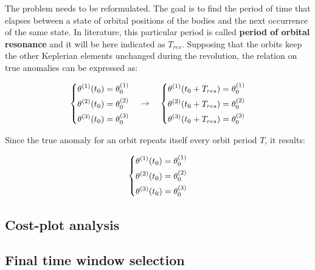 The problem needs to be reformulated. The goal is to find the period of time that elapses between a state of orbital positions of the bodies and the next occurrence of the same state. In literature, this particular period is called \textbf{period of orbital resonance} and it will be here indicated as $T_{res}$. Supposing that the orbits keep the other Keplerian elements unchanged during the revolution, the relation on true anomalies can be expressed as:

\begin{equation}
    \begin{dcases}
        \theta^{(1)} (t_0) = \theta_0^{(1)} \\
        \theta^{(2)} (t_0) = \theta_0^{(2)} \\
        \theta^{(3)} (t_0) = \theta_0^{(3)}
    \end{dcases}
    \quad \rightarrow \quad
    \begin{dcases}
        \theta^{(1)} (t_0 + T_{res}) = \theta_0^{(1)} \\
        \theta^{(2)} (t_0 + T_{res}) = \theta_0^{(2)} \\
        \theta^{(3)} (t_0 + T_{res}) = \theta_0^{(3)}
    \end{dcases}
\end{equation}

Since the true anomaly for an orbit repeats itself every orbit period $T$, it results:

\begin{equation}
    \begin{dcases}
        \theta^{(1)} (t_0) = \theta_0^{(1)} \\
        \theta^{(2)} (t_0) = \theta_0^{(2)} \\
        \theta^{(3)} (t_0) = \theta_0^{(3)}
    \end{dcases}
\end{equation}


\subsection{Cost-plot analysis}
\label{subsec:cost_plot_analysis}

\subsection{Final time window selection}
\label{subsec:final_window}